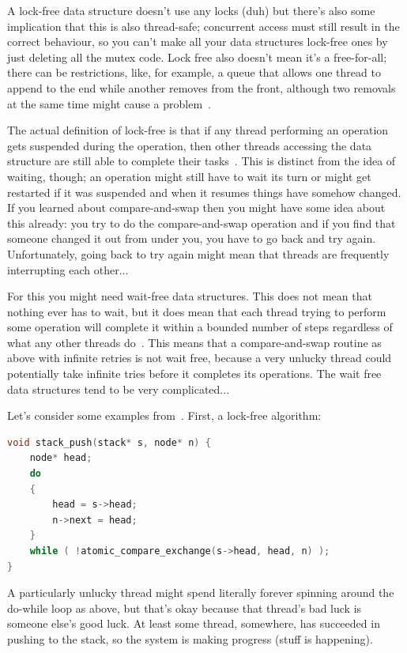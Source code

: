 \documentclass[a4paper]{report}
\begin{document}
A lock-free data structure doesn't use any locks (duh) but there's also some implication that this is also thread-safe; concurrent access must still result in the correct behaviour, so you can't make all your data structures lock-free ones by just deleting all the mutex code. Lock free also doesn't mean it's a free-for-all; there can be restrictions, like, for example, a queue that allows one thread to append to the end while another removes from the front, although two removals at the same time might cause a problem~\cite{nblfwf}.

The actual definition of lock-free is that if any thread performing an operation gets suspended during the operation, then other threads accessing the data structure are still able to complete their tasks~\cite{nblfwf}. This is distinct from the idea of waiting, though; an operation might still have to wait its turn or might get restarted if it was suspended and when it resumes things have somehow changed. If you learned about compare-and-swap then you might have some idea about this already: you try to do the compare-and-swap operation and if you find that someone changed it out from under you, you have to go back and try again. Unfortunately, going back to try again might mean that threads are frequently interrupting each other...

For this you might need wait-free data structures. This does not mean that nothing ever has to wait, but it does mean that each thread trying to perform some operation will complete it within a bounded number of steps regardless of what any other threads do~\cite{nblfwf}. This means that a compare-and-swap routine as above with infinite retries is not wait free, because a very unlucky thread could potentially take infinite tries before it completes its operations. The wait free data structures tend to be very complicated...

Let's consider some examples from~\cite{1024cores}. First, a lock-free algorithm:

\begin{lstlisting}[language=C]
void stack_push(stack* s, node* n) {
    node* head;
    do
    {
        head = s->head;
        n->next = head;
    }
    while ( !atomic_compare_exchange(s->head, head, n) );
} 
\end{lstlisting}

A particularly unlucky thread might spend literally forever spinning around the do-while loop as above, but that's okay because that thread's bad luck is someone else's good luck. At least some thread, somewhere, has succeeded in pushing to the stack, so the system is making progress (stuff is happening). 
\end{document}
